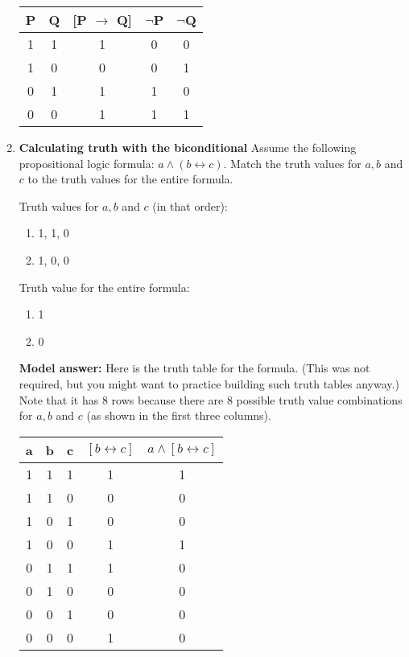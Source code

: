 \documentclass[a4,11pt]{article}
\newcommand{\6}{\mbox{$[\hspace*{-.6mm}[$}}
\newcommand{\9}{\mbox{$]\hspace*{-.6mm}]$}}
\begin{document}
\begin{enumerate}[leftmargin = 12pt]
\begin{tabular}{ccccc}
P & Q & [P $\rightarrow$ Q] & $\neg$P & $\neg$Q \\ \hline
1 & 1 & 1 & 0 & 0 \\ 
1 & 0 & 0 & 0 & 1 \\
0 & 1 & 1 & 1 & 0 \\
0 & 0 & 1 & 1 & 1 \\
\end{tabular}

\item {\bf  Calculating truth with the biconditional} Assume the following propositional logic formula: $a \wedge (b \leftrightarrow c)$. Match the truth values for $a, b$ and $c$ to the truth values for the entire formula. 

Truth values for $a, b$ and $c$ (in that order):

\begin{enumerate}
\item 1, 1, 0

\item 1, 0, 0

\end{enumerate}

Truth value for the entire formula:

\begin{enumerate}
\item 1

\item 0

\end{enumerate}

{ \bf Model answer:}  Here is the truth table for the formula. (This was not required, but you might want to practice building such truth tables anyway.) Note that it has 8 rows because there are 8 possible truth value combinations for $a, b$ and $c$ (as shown in the first three columns).

\begin{tabular}{ccccc}
a & b & c & $[b \leftrightarrow c]$ & $a \wedge [b \leftrightarrow c]$ \\ \hline
1 & 1 & 1 & 1 &  1 \\ 
1 & 1 & 0 & 0 &  0 \\
1 & 0 & 1 & 0 &  0 \\
1 & 0 & 0 & 1 &  1 \\
0 & 1 & 1 & 1 &  0 \\ 
0 & 1 & 0 & 0 &  0 \\
0 & 0 & 1 & 0 &  0\\
0 & 0 & 0 & 1 &  0\\
\end{tabular}


\end{enumerate}
\end{document}

